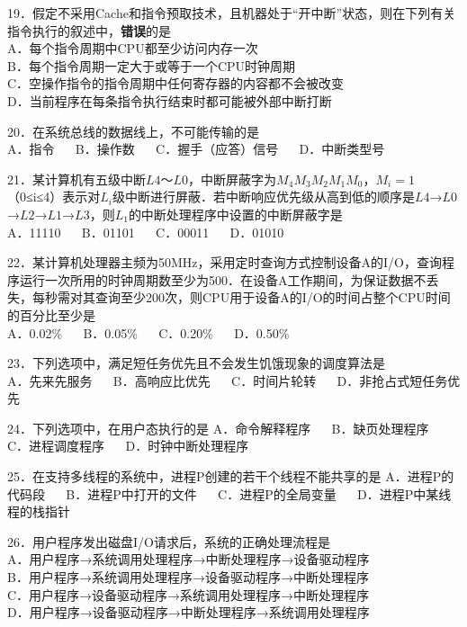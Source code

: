 19．假定不采用Cache和指令预取技术，且机器处于“开中断”状态，则在下列有关指令执行的叙述中，\textbf{错误}的是 \\
A．每个指令周期中CPU都至少访问内存一次 \\
B．每个指令周期一定大于或等于一个CPU时钟周期 \\
C．空操作指令的指令周期中任何寄存器的内容都不会被改变 \\
D．当前程序在每条指令执行结束时都可能被外部中断打断

20．在系统总线的数据线上，不可能传输的是 \\
A．指令 $\quad$ B．操作数 $\quad$ C．握手（应答）信号 $\quad$ D．中断类型号

21．某计算机有五级中断$L4$～$L0$，中断屏蔽字为$M_4M_3M_2M_1M_0$，$M_i=1$（0≤i≤4）表示对$L_i$级中断进行屏蔽．若中断响应优先级从高到低的顺序是$L4$→$L0$→$L2$→$L1$→$L3$，则$L_1$的中断处理程序中设置的中断屏蔽字是 \\
A．11110 $\quad$ B．01101 $\quad$ C．00011 $\quad$ D．01010

22．某计算机处理器主频为50MHz，采用定时查询方式控制设备A的I/O，查询程序运行一次所用的时钟周期数至少为500．在设备A工作期间，为保证数据不丢失，每秒需对其查询至少200次，则CPU用于设备A的I/O的时间占整个CPU时间的百分比至少是 \\
A．0.02\%  $\quad$ B．0.05\%  $\quad$ C．0.20\%  $\quad$ D．0.50\%

23．下列选项中，满足短任务优先且不会发生饥饿现象的调度算法是 \\
A．先来先服务 $\quad$ B．高响应比优先 $\quad$ C．时间片轮转 $\quad$ D．非抢占式短任务优先

24．下列选项中，在用户态执行的是
A．命令解释程序 $\quad$ B．缺页处理程序 $\quad$ C．进程调度程序 $\quad$ D．时钟中断处理程序

25．在支持多线程的系统中，进程P创建的若干个线程不能共享的是
A．进程P的代码段 $\quad$ B．进程P中打开的文件 $\quad$ C．进程P的全局变量 $\quad$ D．进程P中某线程的栈指针

26．用户程序发出磁盘I/O请求后，系统的正确处理流程是 \\
A．用户程序→系统调用处理程序→中断处理程序→设备驱动程序 \\
B．用户程序→系统调用处理程序→设备驱动程序→中断处理程序 \\
C．用户程序→设备驱动程序→系统调用处理程序→中断处理程序 \\
D．用户程序→设备驱动程序→中断处理程序→系统调用处理程序

